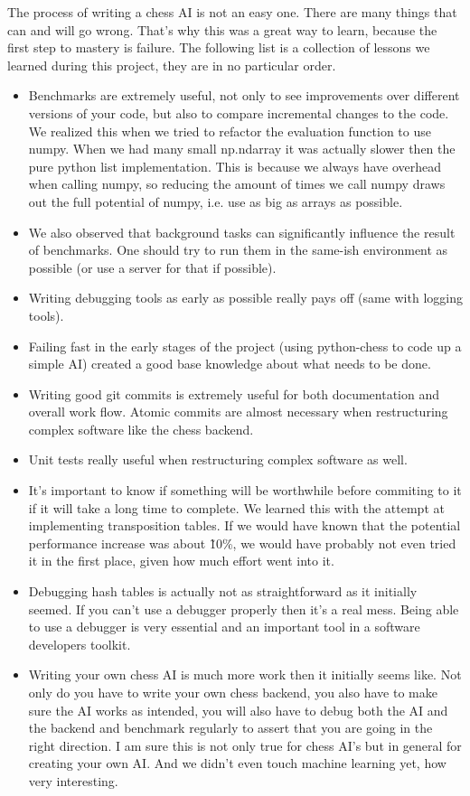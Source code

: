 The process of writing a chess AI is not an easy one.
There are many things that can and will go wrong.
That's why this was a great way to learn,
because the first step to mastery is failure.
The following list is a collection of lessons we learned during
this project, they are in no particular order.

\begin{itemize}
  \item{
Benchmarks are extremely useful,
not only to see improvements over different versions of your code,
but also to compare incremental changes to the code.
We realized this when we tried to refactor the evaluation function to use numpy.
When we had many small np.ndarray it was actually slower then the pure python list implementation.
This is because we always have overhead when calling numpy,
so reducing the amount of times we call numpy draws out the full potential of numpy,
i.e. use as big as arrays as possible.
}
  \item{
We also observed that background tasks can significantly influence the result of benchmarks.
One should try to run them in the same-ish environment as possible
(or use a server for that if possible).
}
  \item{
Writing debugging tools as early as possible really pays off (same with logging tools).
}
  \item{
Failing fast in the early stages of the project (using python-chess to code up a simple AI)
created a good base knowledge about what needs to be done.
}
  \item{
Writing good git commits is extremely useful for both documentation and overall work flow.
Atomic commits are almost necessary when restructuring complex software like the chess backend.
}
  \item{
Unit tests really useful when restructuring complex software as well.
}
  \item{
It's important to know if something will be worthwhile
before commiting to it if it will take a long time to complete.
We learned this with the attempt at implementing transposition tables.
If we would have known that the potential performance increase was about
\~10\%, we would have probably not even tried it in the first place,
given how much effort went into it.
}
  \item{
Debugging hash tables is actually not as straightforward as it initially seemed.
If you can't use a debugger properly then it's a real mess.
Being able to use a debugger is very essential
and an important tool in a software developers toolkit.
}
  \item{
Writing your own chess AI is much more work then it initially seems like.
Not only do you have to write your own chess backend, you also have
to make sure the AI works as intended, you will also have to debug
both the AI and the backend and benchmark regularly to assert that
you are going in the right direction. I am sure this is not only true
for chess AI's but in general for creating your own AI. And we didn't even touch
machine learning yet, how very interesting.
}
\end{itemize}
